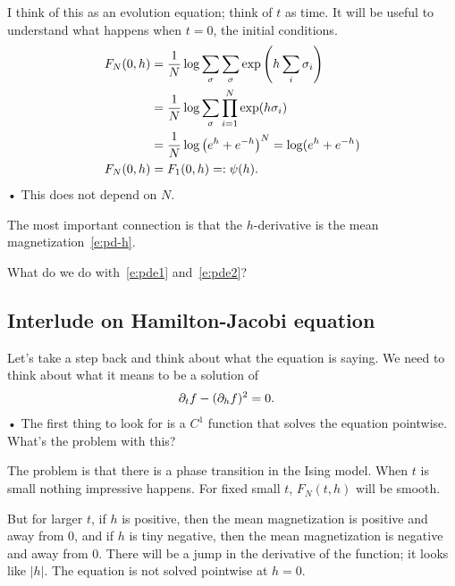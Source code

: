 I think of this as an evolution equation; think of $t$ as time. It will be useful to understand what happens when $t=0$, the initial conditions.
\begin{align}
F_N(0,h) &= \frac{1}{N} \log \sum_\sigma \sum_\sigma \exp\left( {h \sum_i \sigma_i} \right)\\
&= \frac{1}{N} \log \sum_\sigma \prod_{i=1}^{N} \exp(h\sigma_i)\\
&= \frac{1}{N} \log \left( {e^h+e^{-h}} \right)^N = \log(e^h+e^{-h})\\
F_N(0,h) &= F_1(0,h) =: \psi(h).
\label{e:pde2}
\end{align}•
This does not depend on $N$.

The most important connection %
is that the $h$-derivative is the mean magnetization~\eqref{e:pd-h}.

What do we do with~\eqref{e:pde1} and~\eqref{e:pde2}?  

\subsection{Interlude on Hamilton-Jacobi equation}

Let's take a step back and think about what the equation is saying. We need to think about what it means to be a solution of 
\begin{align}
\label{e:hj}
\partial_t f - (\partial_h f)^2&=0.
\end{align}•
The first thing to look for is a $C^1$ function that solves the equation pointwise. What's the problem with this?

The problem is that there is a phase transition in the Ising model. When $t$ is small nothing impressive happens. For fixed small $t$, $F_N(t,h)$ will be smooth. 

But for larger $t$, if $h$ is positive, then the mean magnetization is positive and away from 0, and if $h$ is tiny negative, then the mean magnetization is negative and away from 0. There will be a jump in the derivative of the function; it looks like $|h|$. The equation is not solved pointwise at $h=0$.

